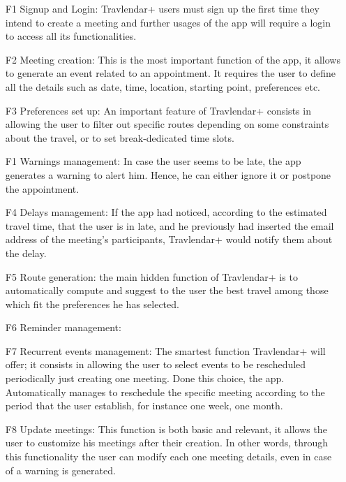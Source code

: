 
\begin{itemize}

\item[\hypertarget{F1}{F1}] Signup and Login: Travlendar+ users must sign up the first time they intend to create a meeting and further usages of the app will require a login to access all its functionalities.
\item[\hypertarget{F2}{F2}] Meeting creation: This is the most important function of the app, it allows to generate an event related to an appointment. It requires the user to define all the details such as date, time, location, starting point, preferences etc. 
\item[\hypertarget{F3}{F3}] Preferences set up: An important feature of Travlendar+ consists in allowing the user to filter out specific routes depending on some constraints about the travel, or to set break-dedicated time slots.
\item[\hypertarget{F1}{F1}] Warnings management: In case the user seems to be late, the app generates a warning to alert him. Hence, he can either ignore it or postpone the appointment.
\item[\hypertarget{F4}{F4}] Delays management:  If the app had noticed, according to the estimated travel time, that the user is in late, and he previously had inserted the email address of the meeting’s participants, Travlendar+ would notify them about the delay. 
\item[\hypertarget{F5}{F5}] Route generation: the main hidden function of Travlendar+ is to automatically compute and suggest to the user the best travel among those which fit the preferences he has selected.
\item[\hypertarget{F6}{F6}] Reminder management:

\item[\hypertarget{F7}{F7}] Recurrent events management: The smartest function Travlendar+ will offer; it consists in allowing the user to select events to be rescheduled periodically just creating one meeting. Done this choice, the app. Automatically manages to  reschedule the specific meeting according to the period that the user establish, for instance one week, one month.
\item[\hypertarget{F8}{F8}] Update meetings: This function is both basic and relevant, it allows the user to customize his meetings after their creation. In other words, through this functionality the user can modify each one meeting details, even in case of a warning is generated.


\end{itemize}

 
